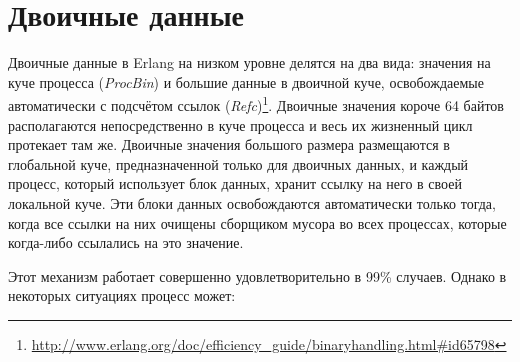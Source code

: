 \section{Двоичные данные}
\label{sec:binaries}

Двоичные данные в Erlang на низком уровне делятся на два вида: значения на куче процесса (\emph{ProcBin}) и большие данные в двоичной куче, освобождаемые автоматически с подсчётом ссылок (\emph{Refc})\footnote{\href{http://www.erlang.org/doc/efficiency\_guide/binaryhandling.html\#id65798}{http://www.erlang.org/doc/efficiency\_guide/binaryhandling.html\#id65798}}. Двоичные значения короче 64 байтов располагаются непосредственно в куче процесса и весь их жизненный цикл протекает там же. Двоичные значения большого размера размещаются в глобальной куче, предназначенной только для двоичных данных, и каждый процесс, который использует блок данных, хранит ссылку на него в своей локальной куче. Эти блоки данных освобождаются автоматически только тогда, когда все ссылки на них очищены сборщиком мусора во всех процессах, которые когда-либо ссылались на это значение.

Этот механизм работает совершенно удовлетворительно в 99\% случаев. Однако в некоторых ситуациях процесс может:

